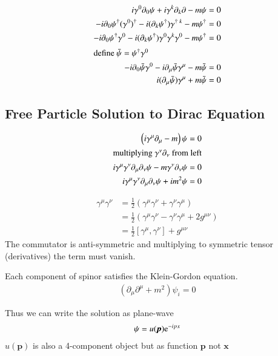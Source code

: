 \begin{align}
   i \gamma^0 \partial_0 \psi + i \gamma^k \partial_k \partial - m \psi = 0 \notag\\
   -i \partial_0 \psi^\dagger (\gamma^0)^\dagger - i(\partial_k \psi^\dagger) \gamma^{\dagger\; k} - m \psi^\dagger = 0 \notag \\
   -i \partial_0 \psi^\dagger \gamma^0 - i(\partial_k \psi^\dagger) \gamma^0 \gamma^k \gamma^0 - m \psi^\dagger = 0 \notag \\
   \shortintertext{define $\bar{\psi} = \psi^\dagger \gamma^0$}
   -i \partial_0 \bar{\psi} \gamma^0 - i \partial_\mu \bar{\psi} \gamma^\mu - m \bar{\psi} = 0 \notag \\
   i(\partial_\mu \bar{\psi}) \gamma^\mu + m \bar{\psi} = 0
\end{align}

\subsection{Free Particle Solution to Dirac Equation}
\begin{align*}
   \left( i \gamma^\mu \partial_\mu - m \right) \psi &= 0 \\
   \shortintertext{multiplying $\gamma^\nu \partial_\nu$ from left}
   i\gamma^\mu \gamma^\nu \partial_\mu \partial_\nu \psi - m \gamma^\nu \partial_\nu \psi &= 0 \\
   i \gamma^\mu \gamma^\nu \partial_\mu \partial_\nu \psi + i m^2 \psi &= 0 \\
\end{align*}

\begin{align*}
   \gamma^\mu \gamma^\nu  &= \frac{1}{2} \left( \gamma^\mu \gamma^\nu + \gamma^\nu \gamma^\mu  \right) \\
                          &= \frac{1}{2} \left( \gamma^\mu \gamma^\nu - \gamma^\nu \gamma^\mu + 2g^{\mu\nu} \right) \\
                          &= \frac{1}{2} \left[ \gamma^\mu , \gamma^\nu \right] + g^{\mu\nu}
\end{align*}
The commutator is anti-symmetric and multiplying to symmetric tensor (derivatives) the term must vanish.

Each component of spinor satisfies the Klein-Gordon equation.
\begin{align}
   (\partial_\mu \partial^\mu + m^2) \psi_i = 0
\end{align}

Thus we can write the solution as plane-wave
\begin{align}
   \psi = u(\pmb{p}) \mathrm{e}^{-ipx}
\end{align}
$u(\pmb{p})$ is also a 4-component object but as function $\pmb{p}$ not $\pmb{x}$

